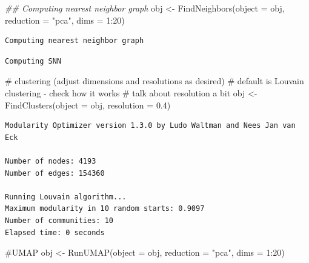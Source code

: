 \documentclass[
  letterpaper,
  DIV=11,
  numbers=noendperiod]{scrartcl}
\newenvironment{Shaded}{\begin{snugshade}}{\end{snugshade}}
\newcommand{\AttributeTok}[1]{\textcolor[rgb]{0.40,0.45,0.13}{#1}}
\newcommand{\CommentTok}[1]{\textcolor[rgb]{0.37,0.37,0.37}{#1}}
\newcommand{\DecValTok}[1]{\textcolor[rgb]{0.68,0.00,0.00}{#1}}
\newcommand{\DocumentationTok}[1]{\textcolor[rgb]{0.37,0.37,0.37}{\textit{#1}}}
\newcommand{\FloatTok}[1]{\textcolor[rgb]{0.68,0.00,0.00}{#1}}
\newcommand{\FunctionTok}[1]{\textcolor[rgb]{0.28,0.35,0.67}{#1}}
\newcommand{\NormalTok}[1]{\textcolor[rgb]{0.00,0.23,0.31}{#1}}
\newcommand{\OtherTok}[1]{\textcolor[rgb]{0.00,0.23,0.31}{#1}}
\newcommand{\SpecialCharTok}[1]{\textcolor[rgb]{0.37,0.37,0.37}{#1}}
\newcommand{\StringTok}[1]{\textcolor[rgb]{0.13,0.47,0.30}{#1}}
\begin{document}
\begin{Shaded}
\begin{Highlighting}[]
\DocumentationTok{\#\# Computing nearest neighbor graph}
\NormalTok{obj }\OtherTok{\textless{}{-}} \FunctionTok{FindNeighbors}\NormalTok{(}\AttributeTok{object =}\NormalTok{ obj, }\AttributeTok{reduction =} \StringTok{"pca"}\NormalTok{, }\AttributeTok{dims =} \DecValTok{1}\SpecialCharTok{:}\DecValTok{20}\NormalTok{)}
\end{Highlighting}
\end{Shaded}

\begin{verbatim}
Computing nearest neighbor graph
\end{verbatim}

\begin{verbatim}
Computing SNN
\end{verbatim}

\begin{Shaded}
\begin{Highlighting}[]
\CommentTok{\# clustering (adjust dimensions and resolutions as desired)}
\CommentTok{\# default is Louvain clustering {-} check how it works}
\CommentTok{\# talk about resolution a bit}
\NormalTok{obj }\OtherTok{\textless{}{-}} \FunctionTok{FindClusters}\NormalTok{(}\AttributeTok{object =}\NormalTok{ obj, }\AttributeTok{resolution =} \FloatTok{0.4}\NormalTok{)}
\end{Highlighting}
\end{Shaded}

\begin{verbatim}
Modularity Optimizer version 1.3.0 by Ludo Waltman and Nees Jan van Eck

Number of nodes: 4193
Number of edges: 154360

Running Louvain algorithm...
Maximum modularity in 10 random starts: 0.9097
Number of communities: 10
Elapsed time: 0 seconds
\end{verbatim}

\begin{Shaded}
\begin{Highlighting}[]
\CommentTok{\#UMAP}
\NormalTok{obj }\OtherTok{\textless{}{-}} \FunctionTok{RunUMAP}\NormalTok{(}\AttributeTok{object =}\NormalTok{ obj, }\AttributeTok{reduction =} \StringTok{"pca"}\NormalTok{, }\AttributeTok{dims =} \DecValTok{1}\SpecialCharTok{:}\DecValTok{20}\NormalTok{)}
\end{Highlighting}
\end{Shaded}
\end{document}
